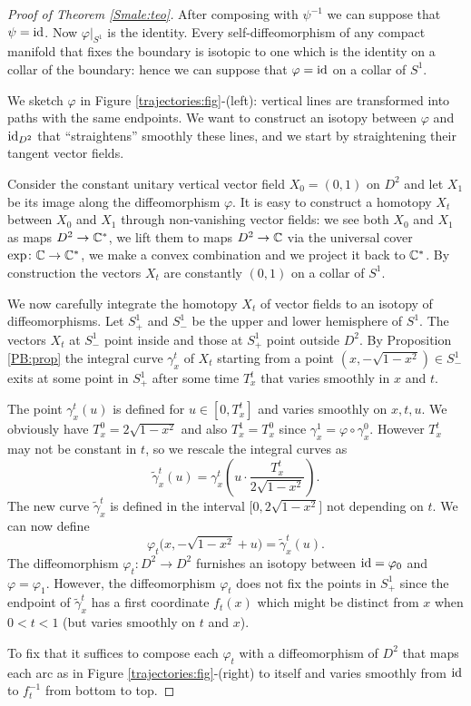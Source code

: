 \begin{proof}[Proof of Theorem \ref{Smale:teo}]
After composing with $\psi^{-1}$ we can suppose that $\psi={\rm id}$. Now $\varphi|_{S^1}$ is the identity. Every self-diffeomorphism of any compact manifold that fixes the boundary is isotopic to one which is the identity on a collar of the boundary: hence we can suppose that $\varphi={\rm id}$ on a collar of $S^1$.

We sketch $\varphi$ in Figure \ref{trajectories:fig}-(left): vertical lines are transformed into paths with the same endpoints. We want to construct an isotopy between $\varphi$ and ${\rm id}_{D^2}$ that ``straightens'' smoothly these lines, and we start by straightening their tangent vector fields.

Consider the constant unitary vertical vector field $X_0=(0,1)$ on $D^2$ and let $X_1$ be its image along the diffeomorphism $\varphi$. It is easy to construct a  homotopy $X_t$ between $X_0$ and $X_1$ through non-vanishing vector fields: we see both $X_0$ and $X_1$ as maps $D^2 \to \mathbb{C}^*$, we lift them to maps $D^2\to \mathbb{C}$ via the universal cover $\exp\colon \mathbb{C} \to \mathbb{C}^*$, we make a convex combination and we project it back to $\mathbb{C}^*$.
By construction the vectors $X_t$ are constantly $(0,1)$ on a collar of $S^1$.

We now carefully integrate the homotopy $X_t$ of vector fields to an isotopy of diffeomorphisms. Let $S^1_+$ and $S^1_-$ be the upper and lower hemisphere of $S^1$. The vectors $X_t$ at $S^1_-$ point inside and those at $S^1_+$ point outside $D^2$. By Proposition \ref{PB:prop} the integral curve $\gamma_x^t$ of $X_t$ starting from a point $(x,-\sqrt{1-x^2}) \in S^1_-$ exits at some point in $S^1_+$ after some time $T_x^t$ that varies smoothly in $x$ and $t$.

The point $\gamma_x^t(u)$ is defined for $u\in [0, T_x^t]$ and varies smoothly on $x,t,u$. We obviously have $T_x^0= 2\sqrt{1-x^2}$ and also $T_x^1 = T_x^0$ since $\gamma_x^1 = \varphi\circ\gamma_x^0$. However $T_x^t$ may not be constant in $t$, so we rescale the integral curves as
$$\tilde\gamma_x^t(u) = \gamma_x^t\left( u \cdot \frac{T_x^t}{2\sqrt{1-x^2}}\right).$$
The new curve $\tilde\gamma_x^t$ is defined in the interval $\big[0, 2\sqrt{1-x^2}\big]$ not depending on $t$. We can now define
$$ \varphi_t \big(x, -\sqrt{1-x^2} + u \big) = \tilde\gamma_x^t\left(u\right).
$$
The diffeomorphism $\varphi_t\colon D^2 \to D^2$ furnishes an isotopy between ${\rm id} = \varphi_0$ and $\varphi=\varphi_1$. However, the diffeomorphism $\varphi_t$ does not fix the points in $S^1_+$ since the endpoint of $\tilde\gamma_x^t$ has a first coordinate $f_t(x)$ which might be distinct from $x$ when $0<t<1$ (but varies smoothly on $t$ and $x$). 

To fix that it suffices to compose each $\varphi_t$ with a diffeomorphism of $D^2$ that maps each arc as in Figure \ref{trajectories:fig}-(right) to itself and varies smoothly from ${\rm id}$ to $f_t^{-1}$ from bottom to top.
\end{proof}

